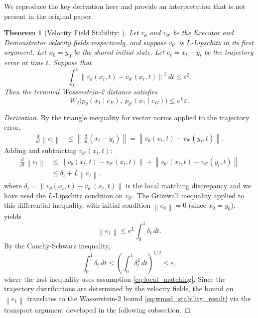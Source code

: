 \documentclass[12pt, a4paper]{article}
\theoremstyle{plain}
\newtheorem{theorem}{Theorem}[section]
\theoremstyle{definition}
\theoremstyle{remark}
\newcommand{\norm}[1]{\left\|#1\right\|}
\newcommand{\WTwo}{W_2}
\begin{document}
We reproduce the key derivation here and provide an interpretation
that is not present in the original paper.

\begin{theorem}[Velocity Field Stability; {\cite{stapf2026wmsd}}]
  \label{thm:wmsd_stability}
  Let $v_\theta$ and $v_{\theta'}$ be the Executor and Demonstrator velocity
  fields respectively, and suppose $v_{\theta'}$ is $L$-Lipschitz in its first
  argument. Let $x_0 = y_0$ be the shared initial state. Let
  $e_t = x_t - y_t$ be the trajectory error at time $t$. Suppose that
  \begin{equation}
    \int_0^1 \norm{v_\theta(x_t, t) - v_{\theta'}(x_t, t)}^2 \, dt \leq \varepsilon^2.
    \label{eq:local_matching}
  \end{equation}
  Then the terminal Wasserstein-2 distance satisfies
  \begin{equation}
    \WTwo\bigl(p_\theta(x_1 \mid c_E),\; p_{\theta'}(x_1 \mid c_D)\bigr)
    \leq e^L \varepsilon.
    \label{eq:wmsd_stability_result}
  \end{equation}
\end{theorem}

\begin{proof}[Derivation]
  By the triangle inequality for vector norms applied to the trajectory error,
  \begin{align}
    \frac{d}{dt}\norm{e_t}
    &\leq \norm{\frac{d}{dt}(x_t - y_t)}
     = \norm{v_\theta(x_t, t) - v_{\theta'}(y_t, t)}.
  \end{align}
  Adding and subtracting $v_{\theta'}(x_t, t)$:
  \begin{align}
    \frac{d}{dt}\norm{e_t}
    &\leq \norm{v_\theta(x_t, t) - v_{\theta'}(x_t, t)}
         + \norm{v_{\theta'}(x_t, t) - v_{\theta'}(y_t, t)} \\
    &\leq \delta_t + L\norm{e_t},
  \end{align}
  where $\delta_t = \norm{v_\theta(x_t, t) - v_{\theta'}(x_t, t)}$ is the
  local matching discrepancy and we have used the $L$-Lipschitz condition on
  $v_{\theta'}$. The Gr\"{o}nwall inequality applied to this differential
  inequality, with initial condition $\norm{e_0} = 0$ (since $x_0 = y_0$), yields
  \begin{equation}
    \norm{e_1} \leq e^L \int_0^1 \delta_t \, dt.
  \end{equation}
  By the Cauchy-Schwarz inequality,
  \begin{equation}
    \int_0^1 \delta_t \, dt
    \leq \left(\int_0^1 \delta_t^2 \, dt\right)^{1/2}
    \leq \varepsilon,
  \end{equation}
  where the last inequality uses assumption \eqref{eq:local_matching}. Since
  the trajectory distributions are determined by the velocity fields, the bound
  on $\norm{e_1}$ translates to the Wasserstein-2 bound
  \eqref{eq:wmsd_stability_result} via the transport argument developed in the
  following subsection.
\end{proof}
\end{document}
